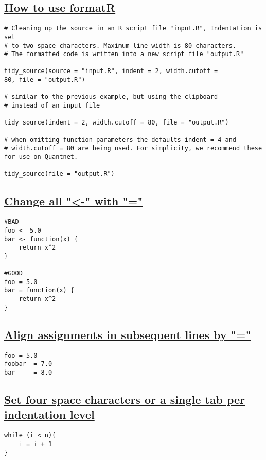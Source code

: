 \documentclass{article}
\begin{document}
\subsection{\label{formatR} \hyperref[formatR-ini]{How to use formatR}}
\begin{lstlisting}[frame=single]
# Cleaning up the source in an R script file "input.R", Indentation is set 
# to two space characters. Maximum line width is 80 characters. 
# The formatted code is written into a new script file "output.R"

tidy_source(source = "input.R", indent = 2, width.cutoff = 
80, file = "output.R")

# similar to the previous example, but using the clipboard 
# instead of an input file

tidy_source(indent = 2, width.cutoff = 80, file = "output.R")

# when omitting function parameters the defaults indent = 4 and 
# width.cutoff = 80 are being used. For simplicity, we recommend these for use on Quantnet.

tidy_source(file = "output.R")

\end{lstlisting}

\subsection{\label{all-equal}\hyperref[all-equal-ini]{Change all "\textless-" with "="}}
\begin{lstlisting}[frame=single]
#BAD
foo <- 5.0
bar <- function(x) {
	return x^2
}

#GOOD
foo = 5.0
bar = function(x) {
	return x^2
}

\end{lstlisting}

\subsection{\label{align-assign}\hyperref[align-assign-ini]{Align assignments in subsequent lines by "="}}
\begin{lstlisting}[frame=single]
foo	= 5.0
foobar 	= 7.0
bar 	= 8.0
\end{lstlisting}

\subsection{\label{indentation}\hyperref[indentation-ini]{Set four space characters or a single tab per indentation level}}
\begin{lstlisting}[frame=single]
while (i < n){
    i = i + 1
}
\end{lstlisting}
\end{document}

